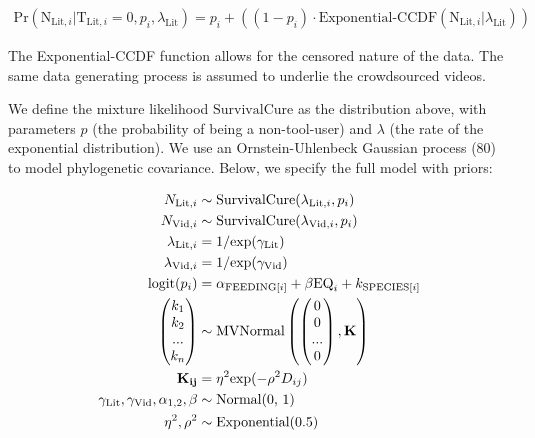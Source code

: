 \documentclass[
  man, donotrepeattitle,floatsintext]{apa6}
\begin{document}
\begin{align}
\text{Pr}(\text{N}_{\text{Lit},i}|\text{T}_{\text{Lit},i} = 0,p_i,\lambda_\text{Lit}) = p_i + ((1-p_i)\cdot\text{Exponential-CCDF}(\text{N}_{\text{Lit},i}|\lambda_\text{Lit}))
\end{align}

The Exponential-CCDF function allows for the censored nature of the data. The
same data generating process is assumed to underlie the crowdsourced videos.

We define the mixture likelihood \(\text{SurvivalCure}\) as the distribution
above, with parameters \(p\) (the probability of being a non-tool-user)
and \(\lambda\) (the rate of the exponential distribution). We use an
Ornstein-Uhlenbeck Gaussian process (80) to model phylogenetic
covariance. Below, we specify the full model with priors:

\begin{align}
N_{\text{Lit},i} &\sim \text{SurvivalCure}(\lambda_{\text{Lit},i}, p_{i}) \\
N_{\text{Vid},i} &\sim \text{SurvivalCure}(\lambda_{\text{Vid},i}, p_{i}) \nonumber \\
\lambda_{\text{Lit},i} &= 1 / \text{exp}(\gamma_\text{Lit}) \nonumber \\
\lambda_{\text{Vid},i} &= 1 / \text{exp}(\gamma_\text{Vid}) \nonumber \\
\text{logit}(p_{i}) &= \alpha_{\text{FEEDING}[i]} + \beta\text{EQ}_{i} +  k_{\text{SPECIES}[i]} \nonumber \\
\begin{pmatrix}k_{1}\\k_{2}\\...\\k_{n}\\\end{pmatrix}
&\sim \text{MVNormal}
\begin{pmatrix}\begin{pmatrix}0\\0\\...\\0\\\end{pmatrix},\bf{K}\end{pmatrix} \nonumber \\
\bf{K}_{ij} &= \eta^2\text{exp}(-\rho^2D_{ij}) \nonumber \\
\gamma_\text{Lit}, \gamma_\text{Vid}, \alpha_{1,2}, \beta &\sim \text{Normal(0, 1)} \nonumber \\
\eta^2, \rho^2 &\sim \text{Exponential(0.5)} \nonumber
\end{align}
\end{document}
